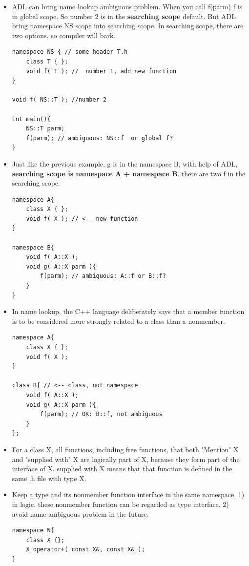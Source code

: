\documentclass[a4paper,11pt,twoside]{book}
\begin{document}
\begin{itemize}
	\item ADL can bring name lookup ambiguous problem.  When you call f(parm) f is in global scope, So number 2 is in the \textbf{searching scope} default. But ADL bring namespace NS scope into searching scope. In searching scope, there are two options, so compiler will bark.
	
\begin{lstlisting}[numbers=none]
namespace NS { // some header T.h
	class T { };
	void f( T ); //  number 1, add new function
}

void f( NS::T ); //number 2
	
int main(){
	NS::T parm;
	f(parm); // ambiguous: NS::f  or global f?
}
\end{lstlisting}
	
	\item Just like the previous example, g is in the namespace B, with help of ADL, \textbf{searching scope is namespace A + namespace B}. there are two f in the searching scope.
	
\begin{lstlisting}[numbers=none]
namespace A{
	class X { };
	void f( X ); // <-- new function
}
	
namespace B{
	void f( A::X );
	void g( A::X parm ){
		f(parm); // ambiguous: A::f or B::f?
	}
}
\end{lstlisting}
	
	\item In name lookup, the C++ language deliberately says that a member function is to be considered more strongly related to a class than a nonmember.
\begin{lstlisting}[numbers=none]
namespace A{
	class X { };
	void f( X );
}
	
class B{ // <-- class, not namespace
	void f( A::X );
	void g( A::X parm ){
		f(parm); // OK: B::f, not ambiguous
	}
};
\end{lstlisting}
	
	\item For a class X, all functions, including free functions, that both "Mention" X
	and "supplied with" X are logically part of X, because they form part of the interface of X. supplied with X means that that function is defined in the same .h file with type X. 
	
	\item Keep a type and its nonmember function interface in the same namespace, 1) in logic, these nonmember function can be regarded as type interface, 2) avoid name ambiguous problem in the future.
\begin{lstlisting}[numbers=none]
namespace N{
	class X {};
	X operator+( const X&, const X& );
}
	

\end{lstlisting}
\end{itemize}
\end{document}
